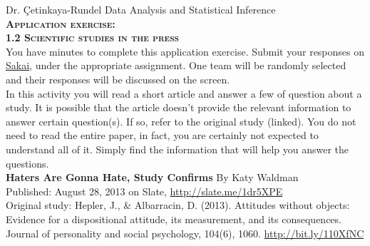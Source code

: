 \documentclass[11pt]{article}
\newcommand{\ttl}[1]{ \textsc{{\LARGE \textbf{{\color{oiB} #1} } }}}
\begin{document}
Dr. \c{C}etinkaya-Rundel \hfill Data Analysis and Statistical Inference \\

\ttl{Application exercise: \\
1.2 Scientific studies in the press} \\

You have \textcolor{oiB}{{ minutes}} to complete this application exercise. Submit your responses on \href{https://sakai.duke.edu/portal/site/2aca0626-74aa-4e80-94cf-744eb75122b1}{Sakai}, under the appropriate assignment. One team will be randomly selected and their responses will be discussed on the screen. \\

In this activity you will read a short article and answer a few of question about a study. It is possible that the article doesn't provide the relevant information to answer certain question(s). If so, refer to the original study (linked). You do not need to read the entire paper, in fact, you are certainly not expected to understand all of it. Simply find the information that will help you answer the questions. \\

\textbf{Haters Are Gonna Hate, Study Confirms}
By  Katy Waldman \\
Published: August 28, 2013 on Slate, \url{http://slate.me/1dr5XPE} \\

Original study: Hepler, J., \& Albarracin, D. (2013). Attitudes without objects: Evidence for a dispositional attitude, its measurement, and its consequences. Journal of personality and social psychology, 104(6), 1060. \url{http://bit.ly/110XfNC}

$\:$ \\
\end{document}
